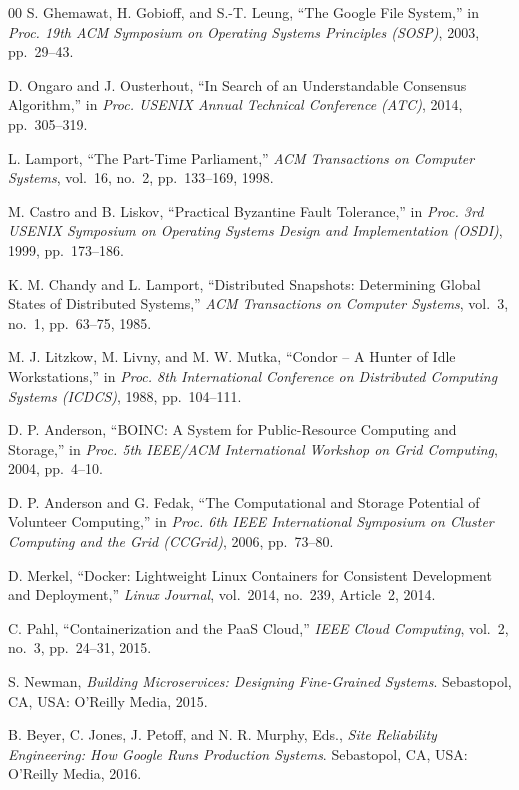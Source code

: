 \documentclass[conference]{IEEEtran}
\begin{document}
\begin{thebibliography}{00}
 S. Ghemawat, H. Gobioff, and S.-T. Leung, ``The Google File System,'' in
\emph{Proc. 19th ACM Symposium on Operating Systems Principles (SOSP)}, 2003, pp.~29--43.

 D. Ongaro and J. Ousterhout, ``In Search of an Understandable Consensus
Algorithm,'' in \emph{Proc. USENIX Annual Technical Conference (ATC)}, 2014, pp.~305--319.

 L. Lamport, ``The Part-Time Parliament,'' \emph{ACM Transactions on
Computer Systems}, vol.~16, no.~2, pp.~133--169, 1998.

 M. Castro and B. Liskov, ``Practical Byzantine Fault Tolerance,'' in
\emph{Proc. 3rd USENIX Symposium on Operating Systems Design and Implementation (OSDI)}, 1999,
pp.~173--186.

 K. M. Chandy and L. Lamport, ``Distributed Snapshots: Determining Global
States of Distributed Systems,'' \emph{ACM Transactions on Computer Systems}, vol.~3, no.~1,
pp.~63--75, 1985.

 M. J. Litzkow, M. Livny, and M. W. Mutka, ``Condor -- A Hunter of Idle
Workstations,'' in \emph{Proc. 8th International Conference on Distributed Computing Systems
(ICDCS)}, 1988, pp.~104--111.

 D. P. Anderson, ``BOINC: A System for Public-Resource Computing and
Storage,'' in \emph{Proc. 5th IEEE/ACM International Workshop on Grid Computing}, 2004, pp.~4--10.

 D. P. Anderson and G. Fedak, ``The Computational and Storage Potential
of Volunteer Computing,'' in \emph{Proc. 6th IEEE International Symposium on Cluster Computing and the
Grid (CCGrid)}, 2006, pp.~73--80.

 D. Merkel, ``Docker: Lightweight Linux Containers for Consistent
Development and Deployment,'' \emph{Linux Journal}, vol.~2014, no.~239, Article~2, 2014.

 C. Pahl, ``Containerization and the PaaS Cloud,'' \emph{IEEE Cloud
Computing}, vol.~2, no.~3, pp.~24--31, 2015.

 S. Newman, \emph{Building Microservices: Designing Fine-Grained
Systems}. Sebastopol, CA, USA: O'Reilly Media, 2015.

 B. Beyer, C. Jones, J. Petoff, and N. R. Murphy, Eds., \emph{Site Reliability
Engineering: How Google Runs Production Systems}. Sebastopol, CA, USA: O'Reilly Media, 2016.


\end{thebibliography}
\end{document}
